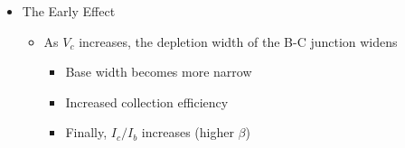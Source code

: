 \begin{itemize}
\begin{itemize}
\begin{itemize}
        \end{itemize}

    \end{itemize}

  \item The Early Effect

    \begin{itemize}

      \item As $V_c$ increases, the depletion width of the B-C junction widens

        \begin{itemize}

          \item Base width becomes more narrow

          \item Increased collection efficiency

          \item Finally, $I_c/I_b$ increases (higher $\beta$)

        \end{itemize}

    \end{itemize}

\end{itemize}



